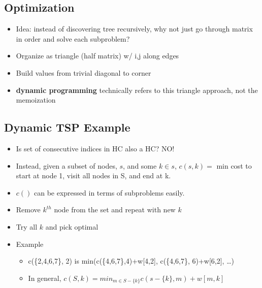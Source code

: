 \documentclass[12pt, letter]{article}
\begin{document}
\subsection*{Optimization}
\begin{itemize}
    \item Idea: instead of discovering tree recursively, why not just go through matrix in order and solve each subproblem?
    \item Organize as triangle (half matrix) w/ i,j along edges
    \item Build values from trivial diagonal to corner
    \item \textbf{dynamic programming} technically refers to this triangle approach, not the memoization
\end{itemize}

\subsection*{Dynamic TSP Example}
\begin{itemize}
    \item Is set of consecutive indices in HC also a HC? NO!
    \item Instead, given a subset of nodes, $s$, and some $k \in s$, $c(s,k)=$ min cost to start at node 1, visit all nodes in S, and end at k.
    \item $c ()$ can be expressed in terms of subproblems easily.
    \item Remove $k ^{th}$ node from the set and repeat with new $k$ 
    \item Try all $k$ and pick optimal
    \item Example
    \begin{itemize}
        \item c(\{2,4,6,7\}, 2) is min(c(\{4,6,7\},4)+w[4,2], c(\{4,6,7\}, 6)+w[6,2], \ldots)
        \item In general, $c(S,k) = min_{m\in S-\{k\}} c(s-\{k\},m)+w[m,k]$
    \end{itemize}
\end{itemize}
\end{document}
